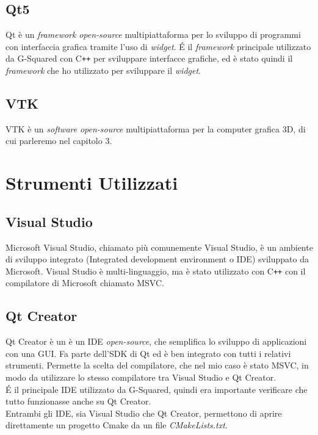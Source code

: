 \subsection{Qt5}\label{sec:Qt5}
Qt è un \emph{framework} \emph{open-source} multipiattaforma per lo sviluppo di programmi con interfaccia grafica tramite l'uso di \emph{widget}.
\'E il \emph{framework} principale utilizzato da G-Squared con C\texttt{++} per sviluppare interfacce grafiche, ed è stato quindi il \emph{framework} che ho utilizzato per sviluppare il \emph{widget}.

\subsection{VTK}
VTK è un \emph{software} \emph{open-source} multipiattaforma per la computer grafica 3D, di cui parleremo nel capitolo 3.

\section{Strumenti Utilizzati}
\subsection{Visual Studio}\label{sec:visual-studio}
Microsoft Visual Studio, chiamato più comunemente Visual Studio, è un ambiente di sviluppo integrato (Integrated development environment o IDE) sviluppato da Microsoft.
Visual Studio è multi-linguaggio, ma è stato utilizzato con C\texttt{++} con il compilatore di Microsoft chiamato MSVC.

\subsection{Qt Creator}\label{sec:qt-creator}
Qt Creator è un è un IDE \emph{open-source}, che semplifica lo sviluppo di applicazioni con una GUI. Fa parte dell'SDK di Qt ed è ben integrato con tutti i relativi strumenti. Permette la scelta del compilatore, che nel mio caso è stato MSVC, in modo da utilizzare lo stesso compilatore tra Visual Studio e Qt Creator.
\\
\'E il principale IDE utilizzato da G-Squared, quindi era importante verificare che tutto funzionasse anche su Qt Creator.
\\
Entrambi gli IDE, sia Visual Studio che Qt Creator, permettono di aprire direttamente un progetto Cmake da un file \emph{CMakeLists.txt}.

